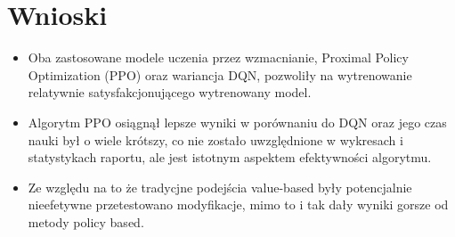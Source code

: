 \documentclass[conference]{IEEEtran}
\begin{document}
\section{Wnioski}
\begin{itemize}
    \item Oba zastosowane modele uczenia przez wzmacnianie, Proximal Policy Optimization (PPO) oraz wariancja DQN, pozwoliły na wytrenowanie relatywnie satysfakcjonującego wytrenowany model.
    
    \item Algorytm PPO osiągnął lepsze wyniki w porównaniu do DQN oraz jego czas nauki był o wiele krótszy, co nie zostało uwzględnione w wykresach i statystykach raportu, ale jest istotnym aspektem efektywności algorytmu.   
    
    \item Ze względu na to że tradycjne podejścia value-based były potencjalnie nieefetywne przetestowano modyfikacje, mimo to i tak dały wyniki gorsze od metody policy based.
\end{itemize}
\end{document}
